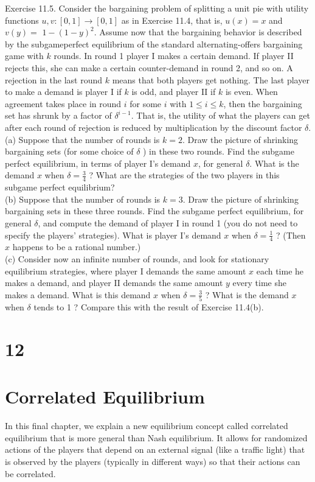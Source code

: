 \documentclass[12pt]{article}
\begin{document}
Exercise 11.5. Consider the bargaining problem of splitting a unit pie with utility functions $u, v:[0,1] \rightarrow[0,1]$ as in Exercise 11.4, that is, $u(x)=x$ and $v(y)=$ $1-(1-y)^{2}$. Assume now that the bargaining behavior is described by the subgameperfect equilibrium of the standard alternating-offers bargaining game with $k$ rounds. In round 1 player I makes a certain demand. If player II rejects this, she can make a certain counter-demand in round 2, and so on. A rejection in the last round $k$ means that both players get nothing. The last player to make a demand is player I if $k$ is odd, and player II if $k$ is even. When agreement takes place in round $i$ for some $i$ with $1 \leq i \leq k$, then the bargaining set has shrunk by a factor of $\delta^{i-1}$. That is, the utility of what the players can get after each round of rejection is reduced by multiplication by the discount factor $\delta$.\\
(a) Suppose that the number of rounds is $k=2$. Draw the picture of shrinking bargaining sets (for some choice of $\delta$ ) in these two rounds. Find the subgame perfect equilibrium, in terms of player I's demand $x$, for general $\delta$. What is the demand $x$ when $\delta=\frac{3}{4}$ ? What are the strategies of the two players in this subgame perfect equilibrium?\\
(b) Suppose that the number of rounds is $k=3$. Draw the picture of shrinking bargaining sets in these three rounds. Find the subgame perfect equilibrium, for general $\delta$, and compute the demand of player I in round 1 (you do not need to specify the players' strategies). What is player I's demand $x$ when $\delta=\frac{1}{4}$ ? (Then $x$ happens to be a rational number.)\\
(c) Consider now an infinite number of rounds, and look for stationary equilibrium strategies, where player I demands the same amount $x$ each time he makes a demand, and player II demands the same amount $y$ every time she makes a demand. What is this demand $x$ when $\delta=\frac{3}{5}$ ? What is the demand $x$ when $\delta$ tends to 1 ? Compare this with the result of Exercise 11.4(b).

\section*{12}
\section*{Correlated Equilibrium}
In this final chapter, we explain a new equilibrium concept called correlated equilibrium that is more general than Nash equilibrium. It allows for randomized actions of the players that depend on an external signal (like a traffic light) that is observed by the players (typically in different ways) so that their actions can be correlated.
\end{document}
